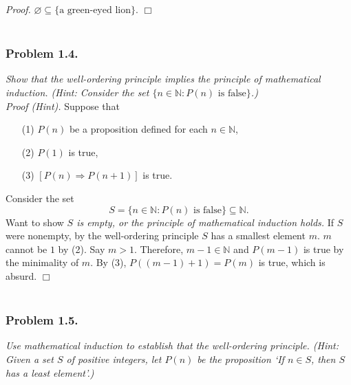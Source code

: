 \documentclass{article}
\begin{document}
\emph{Proof.}
$\varnothing \subseteq \{ \text{a green-eyed lion} \}$.
$\Box$ \\\\






\subsubsection*{Problem 1.4.}
\emph{Show that the well-ordering principle implies
the principle of mathematical induction.
(Hint: Consider the set $\{ n \in \mathbb{N} : P(n) \text{ is false} \}$.)} \\

\emph{Proof (Hint).}
Suppose that
\begin{enumerate}
\item[(1)]
$P(n)$ be a proposition defined for each $n \in \mathbb{N}$,
\item[(2)]
$P(1)$ is true,
\item[(3)]
$[P(n) \Rightarrow P(n+1)]$ is true.
\end{enumerate}

Consider the set
$$S = \{ n \in \mathbb{N} : P(n) \text{ is false} \} \subseteq \mathbb{N}.$$
Want to show
\emph{$S$ is empty, or the principle of mathematical induction holds.}
If $S$ were nonempty,
by the well-ordering principle $S$ has a smallest element $m$.
$m$ cannot be $1$ by (2).
Say $m > 1$.
Therefore, $m - 1 \in \mathbb{N}$
and $P(m-1)$ is true by the minimality of $m$.
By (3), $P((m-1)+1) = P(m)$ is true, which is absurd.
$\Box$ \\\\






\subsubsection*{Problem 1.5.}
\emph{Use mathematical induction to establish
that the well-ordering principle.
(Hint: Given a set $S$ of positive integers,
let $P(n)$ be the proposition
`If $n \in S$, then $S$ has a least element'.)} \\
\end{document}
